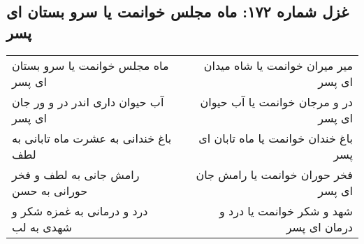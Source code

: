 \begin{center}
\section*{غزل شماره ۱۷۲: ماه مجلس خوانمت یا سرو بستان ای پسر}
\label{sec:172}
\begin{longtable}{l p{0.5cm} r}
ماه مجلس خوانمت یا سرو بستان ای پسر
&&
میر میران خوانمت یا شاه میدان ای پسر
\\
آب حیوان داری اندر در و ور جان ای پسر
&&
در و مرجان خوانمت یا آب حیوان ای پسر
\\
باغ خندانی به عشرت ماه تابانی به لطف
&&
باغ خندان خوانمت یا ماه تابان ای پسر
\\
رامش جانی به لطف و فخر حورانی به حسن
&&
فخر حوران خوانمت یا رامش جان ای پسر
\\
درد و درمانی به غمزه شکر و شهدی به لب
&&
شهد و شکر خوانمت یا درد و درمان ای پسر
\\
\end{longtable}
\end{center}
